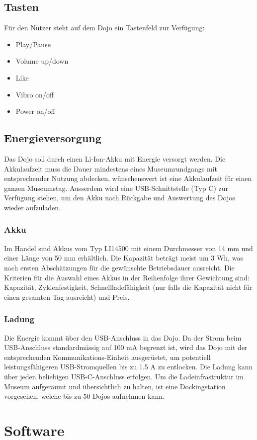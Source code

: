 \subsection{Tasten}
Für den Nutzer steht auf dem Dojo ein Tastenfeld zur Verfügung:\\
\begin{itemize}
	\item Play/Pause
	\item Volume up/down
	\item Like
	\item Vibro on/off
	\item Power on/off\\
\end{itemize}
\newpage
\subsection{Energieversorgung}
Das Dojo soll durch einen Li-Ion-Akku mit Energie versorgt werden. Die Akkulaufzeit muss die Dauer mindestens eines Museumrundgangs mit entsprechender Nutzung abdecken, wünschenswert ist eine Akkulaufzeit für einen ganzen Museumstag. Ausserdem wird eine USB-Schnittstelle (Typ C) zur Verfügung stehen, um den Akku nach Rückgabe und Auswertung des Dojos wieder aufzuladen. 
\subsubsection{Akku}
Im Handel sind Akkus vom Typ LI14500 mit einem Durchmesser von 14 mm und einer Länge von 50 mm erhältlich. Die Kapazität beträgt meist um 3 Wh, was nach ersten Abschätzungen für die gewünschte Betriebsdauer ausreicht. Die Kriterien für die Auswahl eines Akkus in der Reihenfolge ihrer Gewichtung sind: Kapazität, Zyklenfestigkeit, Schnellladefähigkeit (nur falls die Kapazität nicht für einen gesamten Tag ausreicht) und Preis. 
\subsubsection{Ladung}
Die Energie kommt über den USB-Anschluss in das Dojo. Da der Strom beim USB-Anschluss standardmässig auf 100 mA begrenzt ist, wird das Dojo mit der entsprechenden Kommunikations-Einheit ausgerüstet, um potentiell leistungsfähigeren USB-Stromquellen bis zu 1.5 A zu entlocken. Die Ladung kann über jeden beliebigen USB-C-Anschluss erfolgen. Um die Ladeinfrastruktur im Museum aufgeräumt und übersichtlich zu halten, ist eine Dockingstation vorgesehen, welche bis zu 50 Dojos aufnehmen kann. 
\section{Software}
